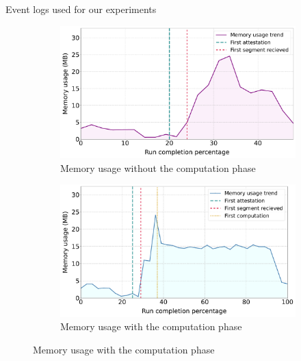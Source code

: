 \begin{table}[t]%
	\caption{Event logs used for our experiments}
	\label{tab:testedlogs}
	\centering
	
\end{table}
%
\begin{figure}[t]
\centering
\begin{subfigure}{0.49\textwidth}
  \centering
  \includegraphics[width=\textwidth]{content/figures/memoryusage1-2.pdf}
  \caption{Memory usage without the computation phase}
  \label{snr_a}
\end{subfigure}\hfill
\begin{subfigure}{0.49\textwidth}
  \centering
  \includegraphics[width=\textwidth]{content/figures/memoryusage2-2.pdf}
  \caption{Memory usage with the computation phase}
  \label{snr_b}   
\end{subfigure}


\end{figure}

